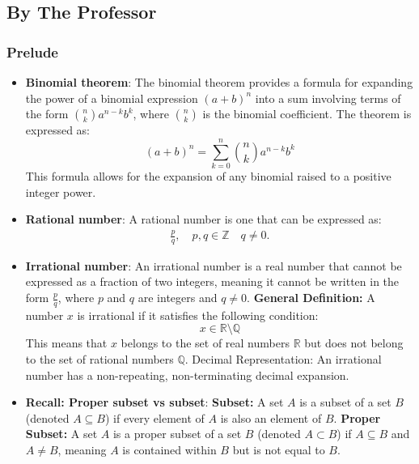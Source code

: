 \documentclass{report}
\begin{document}
    \pagebreak 
    \bigbreak \noindent 
    \subsection{By The Professor}
    \bigbreak \noindent 
    \subsubsection{Prelude}
    \begin{itemize}
        \item \textbf{Binomial theorem}:
            The binomial theorem provides a formula for expanding the power of a binomial expression \((a + b)^n\) into a sum involving terms of the form \(\binom{n}{k} a^{n-k} b^k\), where \(\binom{n}{k}\) is the binomial coefficient. The theorem is expressed as:
            \[
                (a + b)^n = \sum_{k=0}^{n} \binom{n}{k} a^{n-k} b^k
            \]
            This formula allows for the expansion of any binomial raised to a positive integer power.
        \item \textbf{Rational number}: A rational number is one that can be expressed as:
            \begin{align*}
                \frac{p}{q}, \quad p,q \in \mathbb{Z} \quad q \ne 0
            .\end{align*}
        \item \textbf{Irrational number}: An irrational number is a real number that cannot be expressed as a fraction of two integers, meaning it cannot be written in the form \(\frac{p}{q}\), where \(p\) and \(q\) are integers and \(q \neq 0\).
            \bigbreak \noindent 
            \textbf{General Definition:} A number \(x\) is irrational if it satisfies the following condition:
            \[
                x \in \mathbb{R} \setminus \mathbb{Q}
            \]
            This means that \(x\) belongs to the set of real numbers \(\mathbb{R}\) but does not belong to the set of rational numbers \(\mathbb{Q}\).
            \bigbreak \noindent 
            Decimal Representation: An irrational number has a non-repeating, non-terminating decimal expansion.
        \item \textbf{Recall: Proper subset vs subset}: 
            \bigbreak \noindent 
            \textbf{Subset:} A set \(A\) is a subset of a set \(B\) (denoted \(A \subseteq B\)) if every element of \(A\) is also an element of \(B\).
            \bigbreak \noindent 
            \textbf{Proper Subset:} A set \(A\) is a proper subset of a set \(B\) (denoted \(A \subset B\)) if \(A \subseteq B\) and \(A \neq B\), meaning \(A\) is contained within \(B\) but is not equal to \(B\).


\end{itemize}
\end{document}
